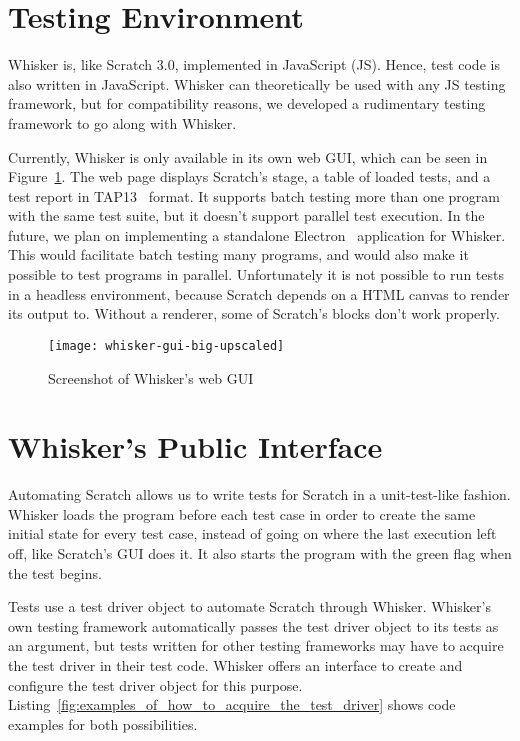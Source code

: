 \section{Testing Environment}
\label{sec:testing_environment}

Whisker is, like Scratch 3.0, implemented in JavaScript (JS).
Hence, test code is also written in JavaScript.
Whisker can theoretically be used with any JS testing framework,
but for compatibility reasons, we developed a rudimentary testing framework to go along with Whisker.
\parspace

Currently, Whisker is only available in its own web GUI, which can be seen in Figure~\ref{fig:whisker_gui}.
The web page displays Scratch's stage, a table of loaded tests, and a test report in TAP13~\cite{tap} format.
It supports batch testing more than one program with the same test suite,
but it doesn't support parallel test execution.
In the future, we plan on implementing a standalone Electron~\cite{electron} application for Whisker.
This would facilitate batch testing many programs,
and would also make it possible to test programs in parallel.
Unfortunately it is not possible to run tests in a headless environment,
because Scratch depends on a HTML canvas to render its output to.
Without a renderer, some of Scratch's blocks don't work properly.

\begin{figure}[htpb]
    \centering
    \texttt{[image: whisker-gui-big-upscaled]}
    \caption{Screenshot of Whisker's web GUI}
    \label{fig:whisker_gui}
\end{figure}

\section{Whisker's Public Interface}
\label{sec:public_interface}

Automating Scratch allows us to write tests for Scratch in a unit-test-like fashion.
Whisker loads the program before each test case in order to create the same initial state for every test case,
instead of going on where the last execution left off, like Scratch's GUI does it.
It also starts the program with the green flag when the test begins.
\parspace

Tests use a test driver object to automate Scratch through Whisker.
Whisker's own testing framework automatically passes the test driver object to its tests as an argument,
but tests written for other testing frameworks may have to acquire the test driver in their test code.
Whisker offers an interface to create and configure the test driver object for this purpose.
Listing~\ref{fig:examples_of_how_to_acquire_the_test_driver} shows code examples for both possibilities.

